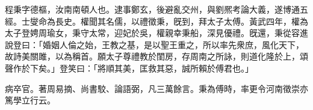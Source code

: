 \begin{pinyinscope}
 
 
 程秉字德樞，汝南南頓人也。逮事鄭玄，後避亂交州，與劉熈考論大義，遂博通五經。士燮命為長史。權聞其名儒，以禮徵秉，旣到，拜太子太傅。黃武四年，權為太子登娉周瑜女，秉守太常，迎妃於吳，權親幸秉船，深見優禮。旣還，秉從容進說登曰：「婚姻人倫之始，王教之基，是以聖王重之，所以率先衆庶，風化天下，故詩美關雎，以為稱首。願太子尊禮教於閨房，存周南之所詠，則道化隆於上，頌聲作於下矣。」登笑曰：「將順其美，匡救其惡，誠所賴於傅君也。」
 
 
 
 
 病卒官。著周易摘、尚書駮、論語弼，凡三萬餘言。秉為傅時，率更令河南徵崇亦篤學立行云。
 
 
 
 
\end{pinyinscope}